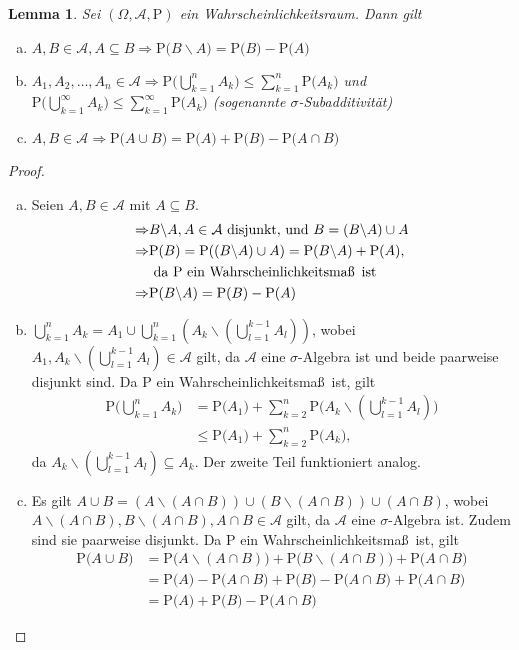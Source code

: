 \documentclass[a4paper,12pt,fleqn]{scrartcl}
\newcommand{\m}[1]{\mathcal{ #1 }}
\newcommand{\p}[1]{\text{P(} #1 \text{)}}
\newcommand{\WR}{Wahrscheinlichkeitsraum}
\newcommand{\WM}{Wahrscheinlichkeitsmaß}
\newcommand{\impl}{\Rightarrow}
\theoremstyle{definition}
\theoremstyle{plain}
\newtheorem{lemma}[definition]{Lemma}
\theoremstyle{remark}
\begin{document}
\begin{lemma}
Sei $(\Omega, \m{A}, \text{P})$ ein \WR. Dann gilt
\begin{enumerate}[a)]
\item $A, B \in \m{A}, A \subseteq B \impl \p{B \backslash A} = \p{B} - \p{A}$
\item $A_1, A_2, \ldots , A_n \in \m{A} \impl \p{\bigcup_{k=1}^n A_k} \leq \sum_{k=1}^n \p{A_k}$ und $\p{\bigcup_{k=1}^\infty A_k} \leq \sum_{k=1}^\infty \p{A_k}$ (sogenannte $\sigma$-Subadditivität)
\item $A, B \in \m{A} \impl \p{A \cup B} = \p{A} + \p{B} - \p{A \cap B}$
\end{enumerate}
\end{lemma}
\begin{proof}
\begin{enumerate}[a)]
\item Seien $A, B \in \m{A}$ mit $A \subseteq B$.
\begin{align*}
\impl &B \backslash A, A \in \m{A} \text{ disjunkt, und } B = (B \backslash A) \cup A \\
\impl &\p{B} = \p{(B \backslash A) \cup A} = \p{B \backslash A} + \p{A}, \\
&\text{ da  P ein \WM \, ist} \\
\impl &\p{B \backslash A} = \p{B} - \p{A}
\end{align*}
\item $\bigcup_{k=1}^n A_k = A_1 \cup \bigcup_{k=1}^n (A_k \backslash (\bigcup_{l=1}^{k-1} A_l))$, wobei $A_1, A_k \backslash (\bigcup_{l=1}^{k-1} A_l) \in \m{A}$ gilt, da $\m{A}$ eine $\sigma$-Algebra ist und beide paarweise disjunkt sind. Da P ein \WM \, ist, gilt
\begin{align*}
\p{\bigcup_{k=1}^n A_k} &= \p{A_1} + \sum_{k=2}^n \p{A_k \backslash (\bigcup_{l=1}^{k-1} A_l)} \\
&\leq \p{A_1} + \sum_{k=2}^n \p{A_k},
\end{align*}
da $A_k \backslash (\bigcup_{l=1}^{k-1} A_l) \subseteq A_k.$ Der zweite Teil funktioniert analog.
\item Es gilt $A \cup B = (A \backslash (A \cap B)) \cup (B \backslash (A \cap B)) \cup (A \cap B)$, wobei $A \backslash (A \cap B), B \backslash (A \cap B), A \cap B \in \m{A}$ gilt, da $\m{A}$ eine $\sigma$-Algebra ist. Zudem sind sie paarweise disjunkt. Da P ein \WM \, ist, gilt
\begin{align*}
\p{A \cup B} &= \p{A \backslash (A \cap B)} + \p{B \backslash (A \cap B)} + \p{A \cap B} \\
&= \p{A} - \p{A \cap B} + \p{B} - \p{A \cap B} + \p{A \cap B} \\
&= \p{A} + \p{B} - \p{A \cap B}
\end{align*}
\end{enumerate}
\end{proof}
\end{document}
